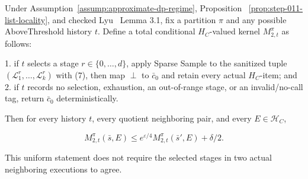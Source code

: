 \begin{proposition}\label{prop:step-011-sparse-privacy}
Under Assumption~\ref{assump:approximate-dp-regime}, Proposition
~\ref{prop:step-011-list-locality}, and checked Lyu~\citep{lyu2025} Lemma 3.1, fix a
partition \(\pi\) and any possible AboveThreshold history \(t\). Define a
total conditional \(H_C\)-valued kernel \(M_{2,t}^{\pi}\) as follows:

1. if \(t\) selects a stage \(r\in\{0,\ldots,d\}\), apply Sparse Sample to
   the sanitized tuple
   \((\mathcal L_1^r,\ldots,\mathcal L_k^r)\) with (7), then map
   \(\perp\) to \(\bar c_0\) and retain every actual \(H_C\)-item; and
2. if \(t\) records no selection, exhaustion, an out-of-range stage, or an
   invalid/no-call tag, return \(\bar c_0\) deterministically.

Then for every history \(t\), every quotient neighboring pair, and every
\(E\in\mathcal H_C\),

\[
 M_{2,t}^{\pi}(\bar s,E)
 \leq e^{\varepsilon/4}
       M_{2,t}^{\pi}(\bar s',E)+\delta/2.
\tag{19}
\]

This uniform statement does not require the selected stages in two actual
neighboring executions to agree.


\end{proposition}

